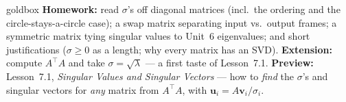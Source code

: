 \documentclass[10pt]{article}
\newcommand{\uu}{\mathbf{u}}
\newcommand{\vv}{\mathbf{v}}
\newcommand{\T}{^{\top}}
\begin{document}
\begin{skillbox}{goldbox}
\textbf{Homework:} read $\sigma$'s off diagonal matrices (incl.\ the ordering and the circle-stays-a-circle
case); a swap matrix separating input vs.\ output frames; a symmetric matrix tying singular values to
Unit~6 eigenvalues; and short justifications ($\sigma\ge0$ as a length; why every matrix has an SVD).
\textbf{Extension:} compute $A\T A$ and take $\sigma=\sqrt{\lambda}$ --- a first taste of Lesson~7.1.
\textbf{Preview:} Lesson~7.1, \emph{Singular Values and Singular Vectors} --- how to \emph{find} the
$\sigma$'s and singular vectors for \emph{any} matrix from $A\T A$, with $\uu_i=A\vv_i/\sigma_i$.
\end{skillbox}
\end{document}
